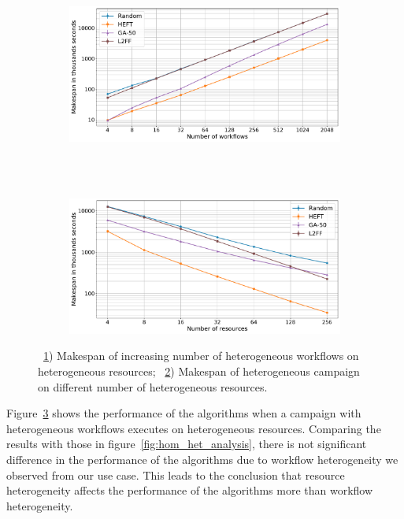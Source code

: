 \begin{figure}[ht!]
    \centering
    \begin{subfigure}[b]{0.75\textwidth}
        \includegraphics[width=.95\textwidth]{figures/campaign/StHeteroCampaigns_4StHeteroResources.pdf}
        \caption{}
        \label{fig:StHeteroCampaigns_4StHeteroResources}
    \end{subfigure}\\
    ~ 
    \begin{subfigure}[b]{0.75\textwidth}
        \includegraphics[width=.95\textwidth]{figures/campaign/StHeteroResources_StHeteroCampaigns.pdf}
        \caption{}
        \label{fig:StHeteroResources_StHeteroCampaigns}
    \end{subfigure}
    \caption{~\ref{fig:StHeteroCampaigns_4StHeteroResources}) Makespan of increasing number of heterogeneous workflows on heterogeneous resources;
        ~\ref{fig:StHeteroResources_StHeteroCampaigns}) Makespan of heterogeneous campaign on different number of heterogeneous resources.}
    \label{fig:heter_analysis}
\end{figure}

Figure~\ref{fig:heter_analysis} shows the performance of the algorithms when a campaign with heterogeneous workflows executes on heterogeneous resources.
Comparing the results with those in figure~\ref{fig:hom_het_analysis}, there is not significant difference in the performance of the algorithms due to workflow heterogeneity we observed from our use case.
This leads to the conclusion that resource heterogeneity affects the performance of the algorithms more than workflow heterogeneity.

